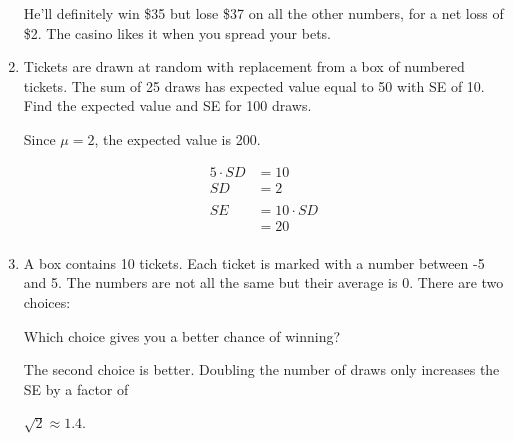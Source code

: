 \documentclass[letterpaper]{exam}
\begin{document}
\begin{enumerate}
      \begin{solution}
        He'll definitely win \$35 but lose \$37 on all the other numbers, for a
        net loss of \$2. The casino likes it when you spread your bets.
      \end{solution}

    \item Tickets are drawn at random with replacement from a box of numbered
      tickets. The sum of 25 draws has expected value equal to 50 with SE of 10.
      Find the expected value and SE for 100 draws.

      \begin{solution}
        Since $\mu = 2$, the expected value is 200.

        \begin{align*}
          5 \cdot SD & = 10 \\
          SD   & = 2 \\
          \\
          SE   & = 10 \cdot SD \\
               & = 20 \\
        \end{align*}
        
      \end{solution}

    \item A box contains 10 tickets. Each ticket is marked with a number between
      -5 and 5. The numbers are not all the same but their average is 0. There
      are two choices:

      Which choice gives you a better chance of winning?

      \begin{solution}
        The second choice is better.  Doubling the number of draws only
        increases the SE by a factor of

        $\sqrt{2} \approx 1.4$. 




\end{solution}
\end{enumerate}
\end{document}
